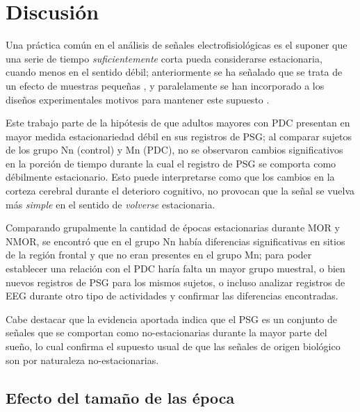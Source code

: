 
\section{Discusión}

Una práctica común en el análisis de señales electrofisiológicas es el suponer que una serie de 
tiempo \textit{suficientemente} corta pueda considerarse estacionaria, cuando menos en el sentido
débil; anteriormente se ha señalado que se trata de un efecto de muestras pequeñas \cite{Melard89},
y paralelamente se han incorporado a los diseños experimentales motivos para mantener este supuesto
\cite{Kaiser00}.

Este trabajo parte de la hipótesis de que adultos mayores con PDC presentan en mayor medida 
estacionariedad débil en sus registros de PSG; al comparar sujetos de los grupo Nn (control) y Mn 
(PDC), no se observaron cambios significativos en la porción de tiempo durante la cual el registro 
de PSG se comporta como débilmente estacionario. 
Esto puede interpretarse como que los cambios en la corteza cerebral durante el deterioro 
cognitivo, no provocan que  la señal se vuelva más \textit{simple} en el sentido de 
\textit{volverse} estacionaria.

Comparando grupalmente la cantidad de épocas estacionarias durante MOR y NMOR, se encontró que en 
el grupo Nn había diferencias significativas en sitios de la región frontal y que no eran presentes
en el grupo Mn; para poder establecer una relación con el PDC haría falta un mayor grupo muestral, 
o bien nuevos registros de PSG para los mismos sujetos, o incluso analizar registros de EEG durante 
otro tipo de actividades y confirmar las diferencias encontradas.

Cabe destacar que la evidencia aportada indica que el PSG es un conjunto de señales que se comportan
como no-estacionarias durante la mayor parte del sueño, lo cual confirma el supuesto usual de que 
las señales de origen biológico son por naturaleza no-estacionarias. 

\subsection{Efecto del tamaño de las época}

